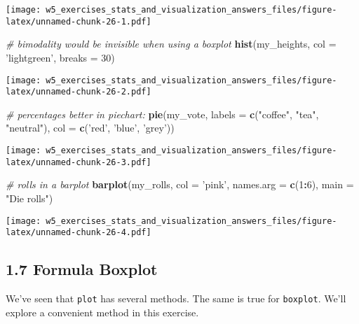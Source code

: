 \documentclass[]{article}
\newenvironment{Shaded}{\begin{snugshade}}{\end{snugshade}}
\newcommand{\CommentTok}[1]{\textcolor[rgb]{0.56,0.35,0.01}{\textit{#1}}}
\newcommand{\DataTypeTok}[1]{\textcolor[rgb]{0.13,0.29,0.53}{#1}}
\newcommand{\DecValTok}[1]{\textcolor[rgb]{0.00,0.00,0.81}{#1}}
\newcommand{\KeywordTok}[1]{\textcolor[rgb]{0.13,0.29,0.53}{\textbf{#1}}}
\newcommand{\NormalTok}[1]{#1}
\newcommand{\OperatorTok}[1]{\textcolor[rgb]{0.81,0.36,0.00}{\textbf{#1}}}
\newcommand{\StringTok}[1]{\textcolor[rgb]{0.31,0.60,0.02}{#1}}
\begin{document}
\texttt{[image: w5\_exercises\_stats\_and\_visualization\_answers\_files/figure-latex/unnamed-chunk-26-1.pdf]}

\begin{Shaded}
\begin{Highlighting}[]
\CommentTok{# bimodality would be invisible when using a boxplot}
\KeywordTok{hist}\NormalTok{(my_heights, }\DataTypeTok{col =} \StringTok{'lightgreen'}\NormalTok{, }\DataTypeTok{breaks =} \DecValTok{30}\NormalTok{)}
\end{Highlighting}
\end{Shaded}

\texttt{[image: w5\_exercises\_stats\_and\_visualization\_answers\_files/figure-latex/unnamed-chunk-26-2.pdf]}

\begin{Shaded}
\begin{Highlighting}[]
\CommentTok{# percentages better in piechart:}
\KeywordTok{pie}\NormalTok{(my_vote, }\DataTypeTok{labels =} \KeywordTok{c}\NormalTok{(}\StringTok{"coffee"}\NormalTok{, }\StringTok{"tea"}\NormalTok{, }\StringTok{"neutral"}\NormalTok{), }\DataTypeTok{col =} \KeywordTok{c}\NormalTok{(}\StringTok{'red'}\NormalTok{, }\StringTok{'blue'}\NormalTok{, }\StringTok{'grey'}\NormalTok{))}
\end{Highlighting}
\end{Shaded}

\texttt{[image: w5\_exercises\_stats\_and\_visualization\_answers\_files/figure-latex/unnamed-chunk-26-3.pdf]}

\begin{Shaded}
\begin{Highlighting}[]
\CommentTok{# rolls in a barplot}
\KeywordTok{barplot}\NormalTok{(my_rolls, }\DataTypeTok{col =} \StringTok{'pink'}\NormalTok{, }\DataTypeTok{names.arg =} \KeywordTok{c}\NormalTok{(}\DecValTok{1}\OperatorTok{:}\DecValTok{6}\NormalTok{), }\DataTypeTok{main =} \StringTok{"Die rolls"}\NormalTok{)}
\end{Highlighting}
\end{Shaded}

\texttt{[image: w5\_exercises\_stats\_and\_visualization\_answers\_files/figure-latex/unnamed-chunk-26-4.pdf]}

\hypertarget{formula-boxplot}{%
\subsection{1.7 Formula Boxplot}\label{formula-boxplot}}

We've seen that \texttt{plot} has several methods. The same is true for
\texttt{boxplot}. We'll explore a convenient method in this exercise.
\end{document}
